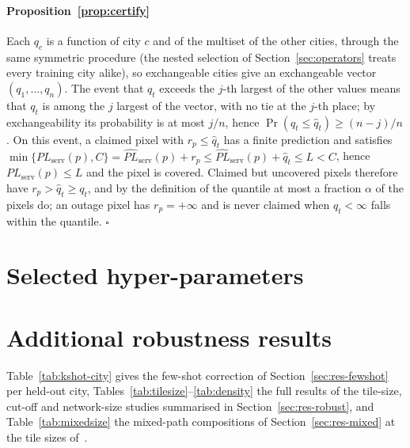\paragraph{Proposition~\ref{prop:certify}}
Each $q_c$ is a function of city $c$ and of the multiset of the other cities,
through the same symmetric procedure (the nested selection of
Section~\ref{sec:operators} treats every training city alike), so
exchangeable cities give an exchangeable vector $(q_1,\dots,q_n)$. The event
that $q_t$ exceeds the $j$-th largest of the other values means that $q_t$
is among the $j$ largest of the vector, with no tie at the $j$-th place; by
exchangeability its probability is at most $j/n$, hence
$\Pr(q_t\le\hat q_t)\ge(n-j)/n$. On this event, a claimed pixel with
$r_p\le\hat q_t$ has a finite prediction and satisfies
$\min\{PL_{\mathrm{serv}}(p),C\}=\widehat{PL}_{\mathrm{serv}}(p)+r_p\le\widehat{PL}_{\mathrm{serv}}(p)+\hat q_t\le L<C$,
hence $PL_{\mathrm{serv}}(p)\le L$ and the pixel is covered. Claimed but uncovered pixels therefore have
$r_p>\hat q_t\ge q_t$, and by the definition of the quantile at most a
fraction $\alpha$ of the pixels do; an outage pixel has $r_p=+\infty$ and
is never claimed when $\hat q_t<\infty$ falls within the quantile.
\hfill$\square$

\onecolumn
\section{Selected hyper-parameters}
\label{app:hparams}

\begin{table}[H]
\centering
\caption{Hyper-parameters selected by the inner leave-one-training-city-out
loop of each split. $N$: training tiles; $\sigma$: kernel bandwidth; $k$:
neighbours; epochs and rounds: median best iteration over the inner folds
(GBDT: for $\gamma$); link model: rounds of the regressor and of the hurdle
classifier.}
\label{tab:hparams}
\small\setlength{\tabcolsep}{3pt}

\end{table}

\section{Additional robustness results}
\label{app:robust}

Table~\ref{tab:kshot-city} gives the few-shot correction of
Section~\ref{sec:res-fewshot} per held-out city,
Tables~\ref{tab:tilesize}--\ref{tab:density} the full results of the
tile-size, cut-off and network-size studies summarised in
Section~\ref{sec:res-robust}, and Table~\ref{tab:mixedsize} the mixed-path
compositions of Section~\ref{sec:res-mixed} at the tile sizes
of~\cite{ozyurt2026}.

